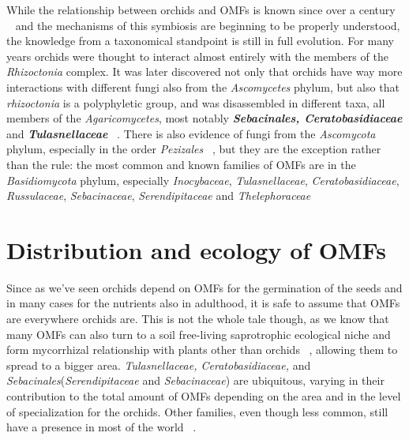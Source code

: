 While the relationship between orchids and OMFs is known since over a century ~\citep{bernard1899, rayner1927, rasmussen2002, selosse2011} and the mechanisms of this symbiosis are beginning to be properly understood, the knowledge from a taxonomical standpoint is still in full evolution. For many years orchids were thought to interact almost entirely with the members of the \emph{Rhizoctonia} complex. It was later discovered not only that orchids have way more interactions with different fungi also from the \emph{Ascomycetes} phylum, but also that \emph{rhizoctonia} is a polyphyletic group, and was disassembled in different taxa, all members of the \emph{Agaricomycetes}, most notably \textbf{\emph{Sebacinales, Ceratobasidiaceae}} and \textbf{\emph{Tulasnellaceae}} ~\citep{dearnaley2012}.
There is also evidence of fungi from the \emph{Ascomycota} phylum, especially in the order \emph{Pezizales} ~\citep{selosse2004, ouanphanivanh2008, waterman2011}, but they are the exception rather than the rule: the most common and known families of OMFs are in the \emph{Basidiomycota} phylum, especially \emph{Inocybaceae}, \emph{Tulasnellaceae}, \emph{Ceratobasidiaceae}, \emph{Russulaceae}, \emph{Sebacinaceae}, \emph{Serendipitaceae} and \emph{Thelephoraceae} ~\citep{taylor2004, roy2009, duffy2019}

\section{Distribution and ecology of OMFs}
\label{distributionandecologyofomfs}

Since as we've seen orchids depend on OMFs for the germination of the seeds and in many cases for the nutrients also in adulthood, it is safe to assume that OMFs are everywhere orchids are. This is not the whole tale though, as we know that many OMFs can also turn to a soil free-living saprotrophic ecological niche and form mycorrhizal relationship with plants other than orchids ~\citep{selosse2014}, allowing them to spread to a bigger area. \emph{Tulasnellaceae, Ceratobasidiaceae,} and \emph{Sebacinales}(\emph{Serendipitaceae} and \emph{Sebacinaceae}) are ubiquitous, varying in their contribution to the total amount of OMFs depending on the area and in the level of specialization for the orchids. Other families, even though less common, still have a presence in most of the world ~\citep{jacquemyn2017}.

